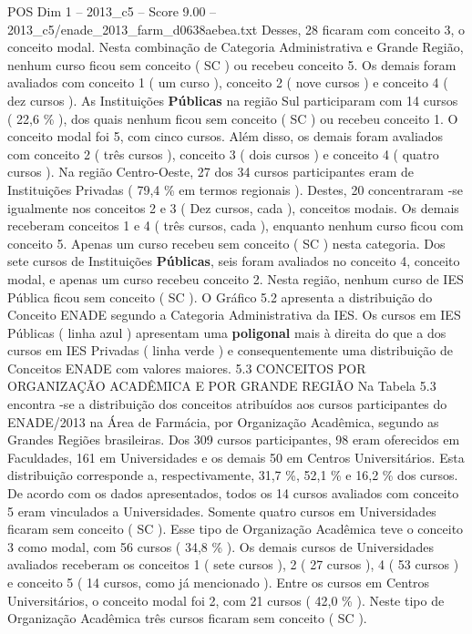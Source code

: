 \begin{textsample}{POS Dim 1 – 2013\_c5 – Score 9.00 – 2013\_c5/enade\_2013\_farm\_d0638aebea.txt}
Desses, 28 ficaram com conceito 3, o conceito modal.
Nesta combinação de Categoria Administrativa e Grande Região, nenhum curso ficou sem conceito ( SC ) ou recebeu conceito 5.
Os demais foram avaliados com conceito 1 ( um curso ), conceito 2 ( nove cursos ) e conceito 4 ( dez cursos ).
As Instituições \textbf{Públicas} na região Sul participaram com 14 cursos ( 22,6 \% ), dos quais nenhum ficou sem conceito ( SC ) ou recebeu conceito 1.
O conceito modal foi 5, com cinco cursos.
Além disso, os demais foram avaliados com conceito 2 ( três cursos ), conceito 3 ( dois cursos ) e conceito 4 ( quatro cursos ).
Na região Centro-Oeste, 27 dos 34 cursos participantes eram de Instituições Privadas ( 79,4 \% em termos regionais ).
Destes, 20 concentraram -se igualmente nos conceitos 2 e 3 ( Dez cursos, cada ), conceitos modais.
Os demais receberam conceitos 1 e 4 ( três cursos, cada ), enquanto nenhum curso ficou com conceito 5.
Apenas um curso recebeu sem conceito ( SC ) nesta categoria.
Dos sete cursos de Instituições \textbf{Públicas}, seis foram avaliados no conceito 4, conceito modal, e apenas um curso recebeu conceito 2.
Nesta região, nenhum curso de IES Pública ficou sem conceito ( SC ).
O Gráfico 5.2 apresenta a distribuição do Conceito ENADE segundo a Categoria Administrativa da IES.
Os cursos em IES Públicas ( linha azul ) apresentam uma \textbf{poligonal} mais à direita do que a dos cursos em IES Privadas ( linha verde ) e consequentemente uma distribuição de Conceitos ENADE com valores maiores. 5.3 CONCEITOS POR ORGANIZAÇÃO ACADÊMICA E POR GRANDE REGIÃO Na Tabela 5.3 encontra -se a distribuição dos conceitos atribuídos aos cursos participantes do ENADE/2013 na Área de Farmácia, por Organização Acadêmica, segundo as Grandes Regiões brasileiras.
Dos 309 cursos participantes, 98 eram oferecidos em Faculdades, 161 em Universidades e os demais 50 em Centros Universitários.
Esta distribuição corresponde a, respectivamente, 31,7 \%, 52,1 \% e 16,2 \% dos cursos.
De acordo com os dados apresentados, todos os 14 cursos avaliados com conceito 5 eram vinculados a Universidades.
Somente quatro cursos em Universidades ficaram sem conceito ( SC ).
Esse tipo de Organização Acadêmica teve o conceito 3 como modal, com 56 cursos ( 34,8 \% ).
Os demais cursos de Universidades avaliados receberam os conceitos 1 ( sete cursos ), 2 ( 27 cursos ), 4 ( 53 cursos ) e conceito 5 ( 14 cursos, como já mencionado ).
Entre os cursos em Centros Universitários, o conceito modal foi 2, com 21 cursos ( 42,0 \% ).
Neste tipo de Organização Acadêmica três cursos ficaram sem conceito ( SC ).

\end{textsample}
